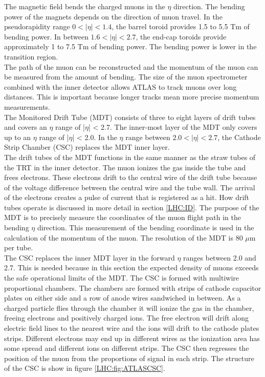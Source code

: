 \indent The magnetic field bends the charged muons in the $\eta$ direction. The bending power of the magnets depends on the direction of muon travel. In the pseudorapidity range $0 < |\eta|< 1.4$, the barrel toroid provides 1.5 to 5.5 Tm of bending power. In between $1.6 < |\eta| < 2.7$, the end-cap toroids provide approximately 1 to 7.5 Tm of bending power. The bending power is lower in the transition region. ~\\
\indent The path of the muon can be reconstructed and the momentum of the muon can be measured from the amount of bending. The size of the muon spectrometer combined with the inner detector allows ATLAS to track muons over long distances. This is important because longer tracks mean more precise momentum measurements.\cite{biblio:JINST} ~\\
\indent The Monitored Drift Tube (MDT) consists of three to eight layers of drift tubes and covers an $\eta$ range of |$\eta$| < 2.7. The inner-most layer of the MDT only covers up to an $\eta$ range of |$\eta$| < 2.0. In the $\eta$ range between $2.0 < |\eta| < 2.7$, the Cathode Strip Chamber (CSC) replaces the MDT inner layer. ~\\
\indent The drift tubes of the MDT functions in the same manner as the straw tubes of the TRT in the inner detector. The muon ionizes the gas inside the tube and frees electrons. These electrons drift to the central wire of the drift tube because of the voltage difference between the central wire and the tube wall. The arrival of the electrons creates a pulse of current that is registered as a hit. How drift tubes operate is discussed in more detail in section \ref{LHC:ID}. The purpose of the MDT is to precisely measure the coordinates of the muon flight path in the bending $\eta$ direction. This measurement of the bending coordinate is used in the calculation of the momentum of the muon. The resolution of the MDT is 80 $\mu$m per tube.\cite{biblio:JINST}~\\
\indent The CSC replaces the inner MDT layer in the forward $\eta$ ranges between 2.0 and 2.7. This is needed because in this section the expected density of muons exceeds the safe operational limits of the MDT.\cite{biblio:JINST} The CSC is formed with multiwire proportional chambers. The chambers are formed with strips of cathode capacitor plates on either side and a row of anode wires sandwiched in between. As a charged particle flies through the chamber it will ionize the gas in the chamber, freeing electrons and positively charged ions. The free electron will drift along electric field lines to the nearest wire and the ions will drift to the cathode plates strips. Different electrons may end up in different wires as the ionization area has some spread and different ions on different strips. The CSC then regresses the position of the muon from the proportions of signal in each strip. The structure of the CSC is show in figure \ref{LHC:fig:ATLASCSC}. ~\\
